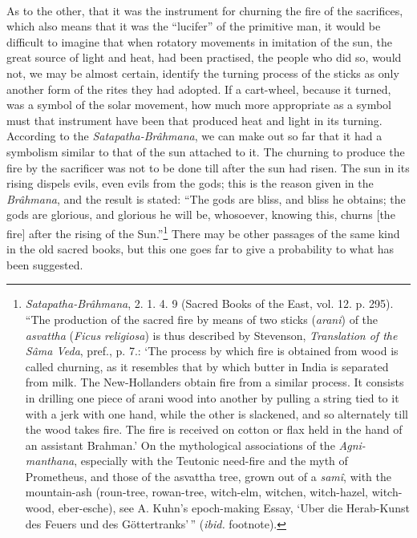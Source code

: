 \documentclass[a4paper, 11pt, oneside, polutonikogreek, english]{article}
\begin{document}
\paragraph{}
As to the other, that it was the instrument for churning the fire of the sacrifices, which also means that it was the ``lucifer'' of the primitive man, it would be difficult to imagine that when rotatory movements in imitation of the sun, the great source of light and heat, had been practised, the people who did so, would not, we may be almost certain, identify the turning process of the sticks as only another form of the rites they had adopted. If a cart-wheel, because it turned, was a symbol of the solar movement, how much more appropriate as a symbol must that instrument have been that produced heat and light in its turning. According to the \emph{Satapatha-Brâhmana}, we can make out so far that it had a symbolism similar to that of the sun attached to it. The churning to produce the fire by the sacrificer was not to be done till after the sun had risen. The sun in its rising dispels evils, even evils from the gods; this is the reason given in the \emph{Brâhmana}, and the result is stated: ``The gods are bliss, and bliss he obtains; the gods are glorious, and glorious he will be, whosoever, knowing this, churns [the fire] after the rising of the Sun.''\footnote{\emph{Satapatha-Brâhmana}, 2. 1. 4. 9 (Sacred Books of the East, vol. 12. p. 295). ``The production of the sacred fire by means of two sticks (\emph{arani}) of the \emph{asvattha} (\emph{Ficus religiosa}) is thus described by Stevenson, \emph{Translation of the Sâma Veda}, pref., p. 7.: `The process by which fire is obtained from wood is called churning, as it resembles that by which butter in India is separated from milk. The New-Hollanders obtain fire from a similar process. It consists in drilling one piece of arani wood into another by pulling a string tied to it with a jerk with one hand, while the other is slackened, and so alternately till the wood takes fire. The fire is received on cotton or flax held in the hand of an assistant Brahman.' On the mythological associations of the \emph{Agni-manthana}, especially with the Teutonic need-fire and the myth of Prometheus, and those of the asvattha tree, grown out of a \emph{samî}, with the mountain-ash (roun-tree, rowan-tree, witch-elm, witchen, witch-hazel, witch-wood, eber-esche), see A. Kuhn's epoch-making Essay, `Uber die Herab-Kunst des Feuers und des Göttertranks'\,'' (\emph{ibid.} footnote).} There may be other passages of the same kind in the old sacred books, but this one goes far to give a probability to what has been suggested.
\end{document}
